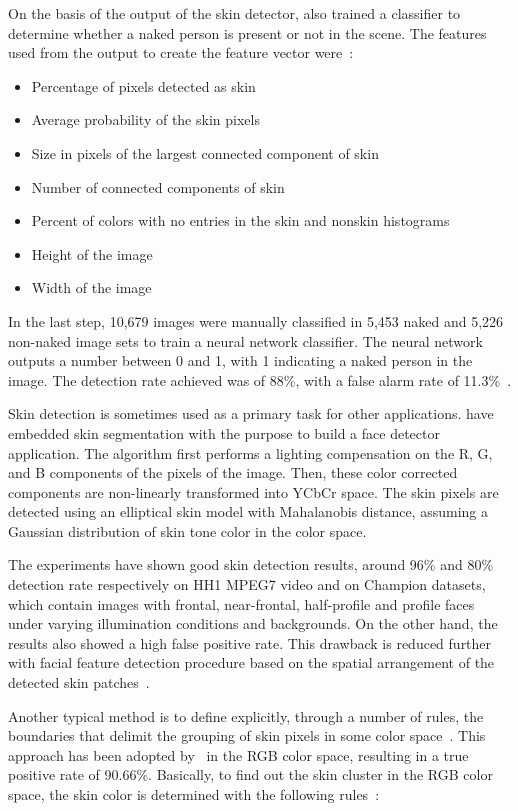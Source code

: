 On the basis of the output of the skin detector, \citet{jones:02} also trained a classifier to determine whether a naked person is present or not in the scene. The features used from the output to create the feature vector were~\citep{jones:02}:
\begin{itemize}
    \item Percentage of pixels detected as skin
    \item Average probability of the skin pixels
    \item Size in pixels of the largest connected component of skin
    \item Number of connected components of skin
    \item Percent of colors with no entries in the skin and nonskin histograms
    \item Height of the image
    \item Width of the image
\end{itemize}

In the last step, 10,679 images were manually classified in 5,453 naked and 5,226 non-naked image sets to train a neural network classifier. The neural network outputs a number between 0 and 1, with 1 indicating a naked person in the image. The detection rate achieved was of 88\%, with a false alarm rate of 11.3\%~\citep{jones:02}.

Skin detection is sometimes used as a primary task for other applications. \citet{hsu:02} have embedded skin segmentation with the purpose to build a face detector application. The algorithm first performs a lighting compensation on the R, G, and B components of the pixels of the image. Then, these color corrected components are non-linearly transformed into YCbCr space. The skin pixels are detected using an elliptical skin model with Mahalanobis distance, assuming a Gaussian distribution of skin tone color in the color space.

The experiments have shown good skin detection results, around 96\% and 80\% detection rate respectively on HH1 MPEG7 video and on Champion datasets, which contain images with frontal, near-frontal, half-profile and profile faces under varying illumination conditions and backgrounds. On the other hand, the results also showed a high false positive rate. This drawback is reduced further with facial feature detection procedure based on the spatial arrangement of the detected skin patches~\citep{hsu:02}.

Another typical method is to define explicitly, through a number of rules, the boundaries that delimit the grouping of skin pixels in some color space~\citep{vezhnevets:03}. This approach has been adopted by~\citet{kovac:03} in the RGB color space, resulting in a true positive rate of 90.66\%. Basically, to find out the skin cluster in the RGB color space, the skin color is determined with the following rules~\citep{kovac:03}:

